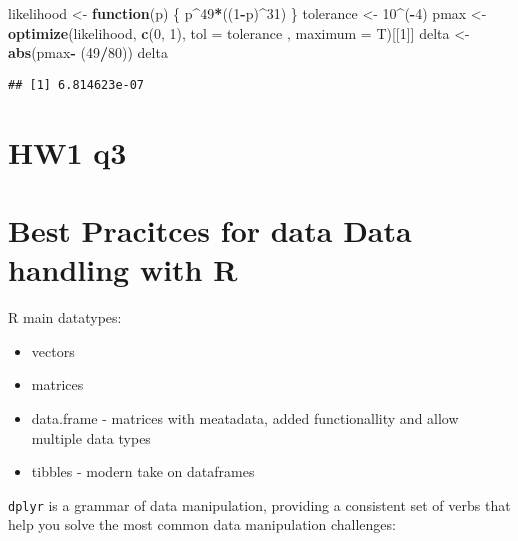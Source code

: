 \documentclass[]{article}
\newenvironment{Shaded}{\begin{snugshade}}{\end{snugshade}}
\newcommand{\ControlFlowTok}[1]{\textcolor[rgb]{0.13,0.29,0.53}{\textbf{#1}}}
\newcommand{\DataTypeTok}[1]{\textcolor[rgb]{0.13,0.29,0.53}{#1}}
\newcommand{\DecValTok}[1]{\textcolor[rgb]{0.00,0.00,0.81}{#1}}
\newcommand{\KeywordTok}[1]{\textcolor[rgb]{0.13,0.29,0.53}{\textbf{#1}}}
\newcommand{\NormalTok}[1]{#1}
\newcommand{\OperatorTok}[1]{\textcolor[rgb]{0.81,0.36,0.00}{\textbf{#1}}}
\newcommand{\StringTok}[1]{\textcolor[rgb]{0.31,0.60,0.02}{#1}}
\providecommand{\tightlist}{%
  \setlength{\itemsep}{0pt}\setlength{\parskip}{0pt}}
\begin{document}
\begin{Shaded}
\begin{Highlighting}[]
\NormalTok{likelihood <-}\StringTok{ }\ControlFlowTok{function}\NormalTok{(p) \{}
\NormalTok{  p}\OperatorTok{^}\DecValTok{49}\OperatorTok{*}\NormalTok{((}\DecValTok{1}\OperatorTok{-}\NormalTok{p)}\OperatorTok{^}\DecValTok{31}\NormalTok{)}
\NormalTok{\}}
\NormalTok{tolerance <-}\StringTok{ }\DecValTok{10}\OperatorTok{^}\NormalTok{(}\OperatorTok{-}\DecValTok{4}\NormalTok{) }
\NormalTok{pmax <-}\StringTok{ }\KeywordTok{optimize}\NormalTok{(likelihood, }\KeywordTok{c}\NormalTok{(}\DecValTok{0}\NormalTok{, }\DecValTok{1}\NormalTok{), }\DataTypeTok{tol =}\NormalTok{ tolerance  , }\DataTypeTok{maximum =}\NormalTok{ T)[[}\DecValTok{1}\NormalTok{]]}
\NormalTok{delta <-}\StringTok{ }\KeywordTok{abs}\NormalTok{(pmax}\OperatorTok{-}\StringTok{ }\NormalTok{(}\DecValTok{49}\OperatorTok{/}\DecValTok{80}\NormalTok{))}
\NormalTok{delta}
\end{Highlighting}
\end{Shaded}

\begin{verbatim}
## [1] 6.814623e-07
\end{verbatim}

\hypertarget{hw1-q3}{%
\section{HW1 q3}\label{hw1-q3}}

\hypertarget{best-pracitces-for-data-data-handling-with-r}{%
\section{Best Pracitces for data Data handling with
R}\label{best-pracitces-for-data-data-handling-with-r}}

R main datatypes:

\begin{itemize}
\tightlist
\item
  vectors
\item
  matrices
\item
  data.frame - matrices with meatadata, added functionallity and allow
  multiple data types
\item
  tibbles - modern take on dataframes
\end{itemize}

\texttt{dplyr} is a grammar of data manipulation, providing a consistent
set of verbs that help you solve the most common data manipulation
challenges:
\end{document}
